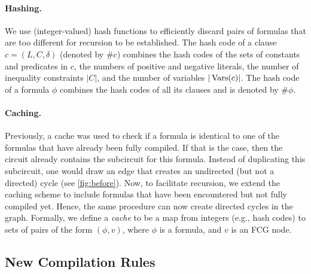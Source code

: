 
\paragraph{Hashing.}
We use (integer-valued) hash functions to efficiently discard pairs of formulas that are too different for recursion to be established. The hash code of a clause $c = (L, C, \delta)$ (denoted by $\# c$) combines the hash codes of the sets of constants and predicates in $c$, the numbers of positive and negative literals, the number of inequality constraints $|C|$, and the number of variables $|\operatorname{Vars}(c)|$. The hash code of a formula $\phi$ combines the hash codes of all its clauses and is denoted by $\#\phi$.

\paragraph{Caching.}
Previously, a cache was used to check if a formula is identical to one of the formulas that have already been fully compiled. If that is the case, then the circuit already contains the subcircuit for this formula. Instead of duplicating this subcircuit, one would draw an edge that creates an undirected (but not a directed) cycle (see \cref{fig:before}). Now, to facilitate recursion, we extend the caching scheme to include formulas that have been encountered but not fully compiled yet. Hence, the same procedure can now create directed cycles in the graph. Formally, we define a \emph{cache} to be a map from integers (e.g., hash codes) to sets of pairs of the form $(\phi, v)$, where $\phi$ is a formula, and $v$ is an FCG node.



\subsection{New Compilation Rules} \label{sec:rules}

